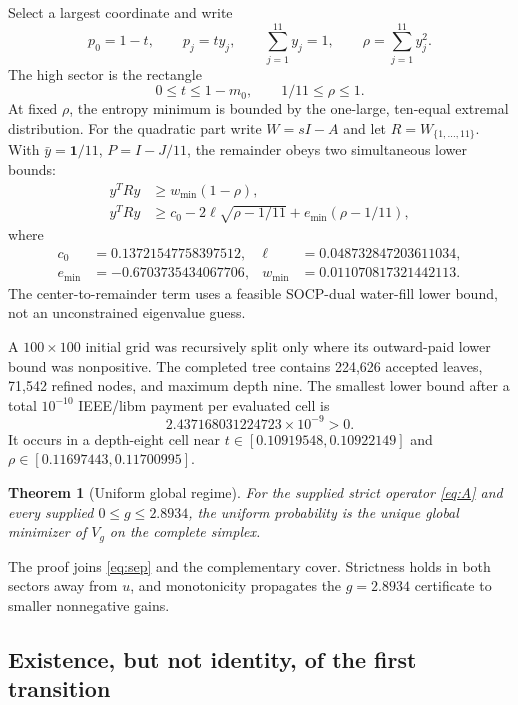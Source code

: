 \documentclass[11pt,a4paper]{article}
\newtheorem{theorem}{Theorem}
\begin{document}
Select a largest coordinate and write
\[
 p_0=1-t,\qquad p_j=t y_j,\qquad
 \sum_{j=1}^{11}y_j=1,\qquad \rho=\sum_{j=1}^{11}y_j^2.
\]
The high sector is the rectangle
\[
 0\le t\le1-m_0,\qquad 1/11\le\rho\le1.
\]
At fixed $\rho$, the entropy minimum is bounded by the one-large,
ten-equal extremal distribution.  For the quadratic part write $W=sI-A$ and
let $R=W_{\{1,\dots,11\}}$.  With $\bar y=\mathbf 1/11$, $P=I-J/11$, the
remainder obeys two simultaneous lower bounds:
\begin{align}
 y^TRy&\ge w_{\min}(1-\rho),\\
 y^TRy&\ge c_0-2\ell\sqrt{\rho-1/11}
                +e_{\min}(\rho-1/11),\label{eq:Rbound}
\end{align}
where
\begin{align*}
 c_0&=0.13721547758397512,&
 \ell&=0.048732847203611034,\\
 e_{\min}&=-0.6703735434067706,&
 w_{\min}&=0.011070817321442113.
\end{align*}
The center-to-remainder term uses a feasible SOCP-dual water-fill lower bound,
not an unconstrained eigenvalue guess.

A $100\times100$ initial grid was recursively split only where its outward-paid
lower bound was nonpositive.  The completed tree contains 224,626 accepted
leaves, 71,542 refined nodes, and maximum depth nine.  The smallest lower
bound after a total $10^{-10}$ IEEE/libm payment per evaluated cell is
\begin{equation}\label{eq:globalmargin}
 2.437168031224723\times10^{-9}>0.
\end{equation}
It occurs in a depth-eight cell near
$t\in[0.10919548,0.10922149]$ and
$\rho\in[0.11697443,0.11700995]$.

\begin{theorem}[Uniform global regime]\label{thm:uniform}
For the supplied strict operator \eqref{eq:A} and every supplied
$0\le g\le2.8934$, the uniform probability is the unique global minimizer of
$V_g$ on the complete simplex.
\end{theorem}

The proof joins \eqref{eq:sep} and the complementary cover.  Strictness holds
in both sectors away from $u$, and monotonicity propagates the $g=2.8934$
certificate to smaller nonnegative gains.

\subsection{Existence, but not identity, of the first transition}
\end{document}
